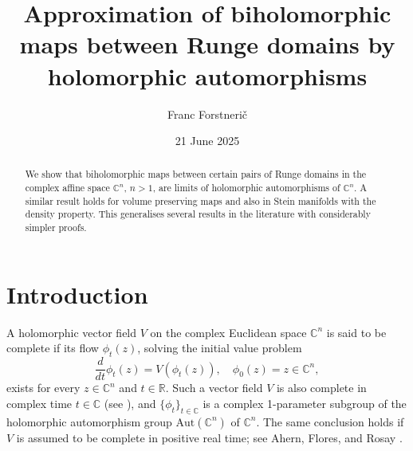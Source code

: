 \documentclass[12pt]{amsart}
\theoremstyle{definition}
\numberwithin{equation}{section}
\numberwithin{figure}{section}
\newcommand\C{\mathbb{C}}
\newcommand\R{\mathbb{R}}
\newcommand\Aut{\mathrm{Aut}}
\numberwithin{equation}{section}
\begin{document}
\title{Approximation of biholomorphic maps between Runge domains 
by holomorphic automorphisms
}
\author{Franc Forstneri\v{c}}

\address{Franc Forstneri\v c, Faculty of Mathematics and Physics, University of Ljubljana, and Institute of Mathematics, Physics, and Mechanics, Jadranska 19, 1000 Ljubljana, Slovenia}


\date{21 June 2025}


\begin{abstract}
We show that biholomorphic maps between certain pairs
of Runge domains in the complex affine space $\C^n$, $n>1$, 
are limits of holomorphic automorphisms of $\C^n$. A similar result
holds for volume preserving maps and also 
in Stein manifolds with the density property. This generalises 
several results in the literature with considerably simpler proofs.
\end{abstract}

\maketitle


%
%
%
%
\section{Introduction}\label{sec:intro} 

A holomorphic vector field $V$ on the complex Euclidean space $\C^n$
is said to be complete if its flow $\phi_t(z)$, solving the initial
value problem 
\[
	\frac{d}{dt}\phi_t(z)=V(\phi_t(z)), \quad \phi_0(z)=z\in \C^n,
\]
exists for every $z\in \C^n$ and $t\in\R$. Such a vector field $V$ is also 
complete in complex time $t\in\C$ 
(see \cite[Corollary 2.2]{Forstneric1996MZ}), 
and $\{\phi_t\}_{t\in\C}$ is a complex 1-parameter subgroup 
of the holomorphic automorphism group $\Aut(\C^n)$ of $\C^n$. 
The same conclusion holds if $V$ is assumed to be 
complete in positive real time;
see Ahern, Flores, and Rosay \cite{AhernFloresRosay2000}.
\end{document}
